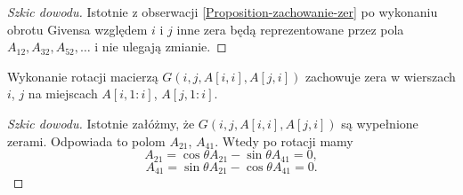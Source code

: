 \documentclass[12pt,a4paper]{report}
\newcommand{\mx}[1]{{#1}}
\begin{document}
\begin{proof}[Szkic dowodu]
Istotnie z obserwacji \ref{Proposition-zachowanie-zer} po wykonaniu obrotu Givensa względem $i$ i $j$ inne zera będą reprezentowane przez pola $\mx{A}_{12}, \mx{A}_{32}, \mx{A}_{52}, \ldots$ i nie ulegają zmianie.
\end{proof}



\begin{proposition}\label{Proposition-zera-w-wierszach}
Wykonanie rotacji macierzą $\mx{G}(i,j, \mx{A}[i,i], \mx{A}[j,i])$ zachowuje zera w wierszach $i$, $j$ na miejscach $\mx{A}[i,1:i]$, $\mx{A}[j, 1:i]$. 
\end{proposition}
\begin{proof}[Szkic dowodu]

Istotnie załóżmy, że $\mx{G}(i,j, \mx{A}[i,i], \mx{A}[j,i])$ są wypełnione zerami. Odpowiada to polom $\mx{A}_{21}$, $\mx{A}_{41}$. Wtedy po rotacji mamy 
$$
\mx{A}_{21} = \cos\theta\mx{A}_{21} - \sin\theta\mx{A}_{41} = 0,
$$  
$$
\mx{A}_{41} = \sin\theta\mx{A}_{21} - \cos\theta\mx{A}_{41} = 0.
$$
\end{proof}
\end{document}
